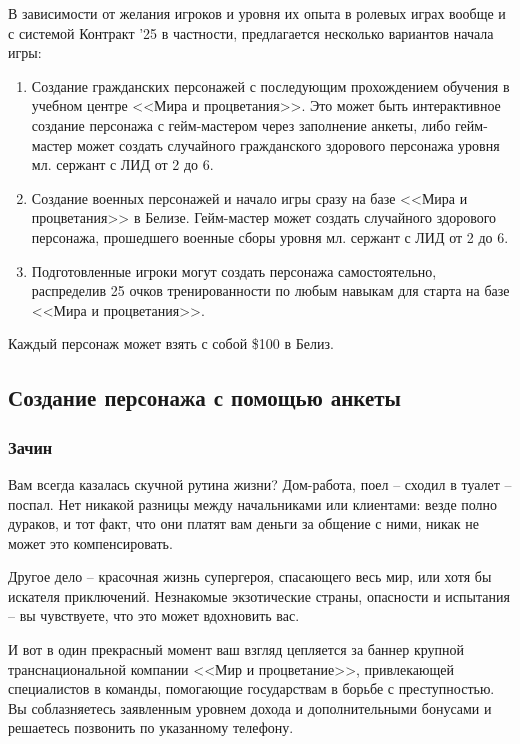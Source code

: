 \documentclass{article}
\begin{document}
В зависимости от желания игроков и уровня их опыта в ролевых играх
вообще и с системой Контракт '25 в частности, предлагается несколько
вариантов начала игры:

\begin{enumerate}
\def\labelenumi{\arabic{enumi}.}
\item
  Создание гражданских персонажей с последующим прохождением обучения в
  учебном центре <<Мира и процветания>>. Это может быть интерактивное
  создание персонажа с гейм-мастером через заполнение анкеты, либо
  гейм-мастер может создать случайного гражданского здорового персонажа
  уровня мл. сержант с ЛИД от 2 до 6.
\item
  Создание военных персонажей и начало игры сразу на базе <<Мира и
  процветания>> в Белизе. Гейм-мастер может создать случайного здорового
  персонажа, прошедшего военные сборы уровня мл. сержант с ЛИД от 2 до
  6.
\item
  Подготовленные игроки могут создать персонажа самостоятельно,
  распределив 25 очков тренированности по любым навыкам для старта на
  базе <<Мира и процветания>>.
\end{enumerate}

Каждый персонаж может взять с собой \$100 в Белиз.

\subsection{Создание персонажа с помощью
анкеты}\label{questionnaire-character}

\subsubsection{Зачин}\label{prologue}

Вам всегда казалась скучной рутина жизни? Дом-работа, поел -- сходил в
туалет -- поспал. Нет никакой разницы между начальниками или клиентами:
везде полно дураков, и тот факт, что они платят вам деньги за общение с
ними, никак не может это компенсировать.

Другое дело -- красочная жизнь супергероя, спасающего весь мир, или хотя
бы искателя приключений. Незнакомые экзотические страны, опасности и
испытания -- вы чувствуете, что это может вдохновить вас.

И вот в один прекрасный момент ваш взгляд цепляется за баннер крупной
транснациональной компании <<Мир и процветание>>, привлекающей
специалистов в команды, помогающие государствам в борьбе с
преступностью. Вы соблазняетесь заявленным уровнем дохода и
дополнительными бонусами и решаетесь позвонить по указанному телефону.
\end{document}
